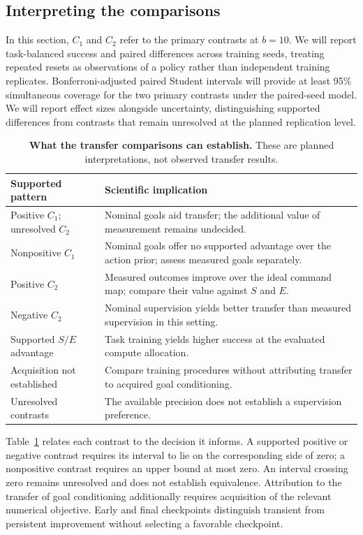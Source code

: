 \documentclass[conference]{IEEEtran}
\begin{document}
\subsection{Interpreting the comparisons}
In this section, $C_1$ and $C_2$ refer to the primary contrasts at $b=10$. We will report task-balanced success and paired differences across training seeds, treating repeated resets as observations of a policy rather than independent training replicates. Bonferroni-adjusted paired Student intervals will provide at least 95\% simultaneous coverage for the two primary contrasts under the paired-seed model. We will report effect sizes alongside uncertainty, distinguishing supported differences from contrasts that remain unresolved at the planned replication level.

\begin{table}[t]
\caption{\textbf{What the transfer comparisons can establish.} These are planned interpretations, not observed transfer results.}
\label{tab:outcomes}
\centering
\footnotesize
\begin{tabular}{@{}p{2.40cm}p{5.07cm}@{}}
\toprule
Supported pattern & Scientific implication\\
\midrule
Positive $C_1$; unresolved $C_2$ & Nominal goals aid transfer; the additional value of measurement remains undecided.\\
Nonpositive $C_1$ & Nominal goals offer no supported advantage over the action prior; assess measured goals separately.\\
Positive $C_2$ & Measured outcomes improve over the ideal command map; compare their value against $S$ and $E$.\\
Negative $C_2$ & Nominal supervision yields better transfer than measured supervision in this setting.\\
Supported $S/E$ advantage & Task training yields higher success at the evaluated compute allocation.\\
Acquisition not established & Compare training procedures without attributing transfer to acquired goal conditioning.\\
Unresolved contrasts & The available precision does not establish a supervision preference.\\
\bottomrule
\end{tabular}
\end{table}

Table~\ref{tab:outcomes} relates each contrast to the decision it informs. A supported positive or negative contrast requires its interval to lie on the corresponding side of zero; a nonpositive contrast requires an upper bound at most zero. An interval crossing zero remains unresolved and does not establish equivalence. Attribution to the transfer of goal conditioning additionally requires acquisition of the relevant numerical objective. Early and final checkpoints distinguish transient from persistent improvement without selecting a favorable checkpoint.
\end{document}

